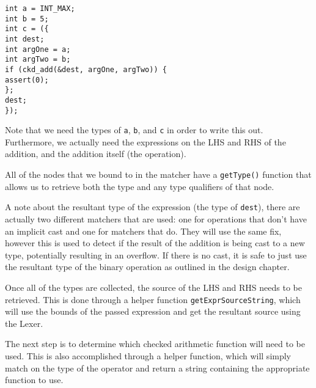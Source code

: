 \begin{center}
\parbox{0.9\linewidth}{
\texttt{int a = INT\_MAX;\\
int b = 5;\\
int c = (\{\\
\hspace*{1.5em}int dest;\\
\hspace*{1.5em}int argOne = a;\\
\hspace*{1.5em}int argTwo = b;\\
\hspace*{1.5em}if (ckd\_add(\&dest, argOne, argTwo)) \{\\
\hspace*{3em}assert(0);\\
\hspace*{1.5em}\};\\
\hspace*{1.5em}dest;\\
\});}
}
\end{center}

Note that we need the types of \texttt{a}, \texttt{b}, and \texttt{c} in order to write this out. Furthermore, we actually need the expressions on the LHS and RHS of the addition, and the addition itself (the operation).

All of the nodes that we bound to in the matcher have a \texttt{getType()} function that allows us to retrieve both the type and any type qualifiers of that node.

A note about the resultant type of the expression (the type of \texttt{dest}), there are actually two different matchers that are used: one for operations that don't have an implicit cast and one for matchers that do. They will use the same fix, however this is used to detect if the result of the addition is being cast to a new type, potentially resulting in an overflow. If there is no cast, it is safe to just use the resultant type of the binary operation as outlined in the design chapter.

Once all of the types are collected, the source of the LHS and RHS needs to be retrieved. This is done through a helper function \texttt{getExprSourceString}, which will use the bounds of the passed expression and get the resultant source using the Lexer.

The next step is to determine which checked arithmetic function will need to be used. This is also accomplished through a helper function, which will simply match on the type of the operator and return a string containing the appropriate function to use.

